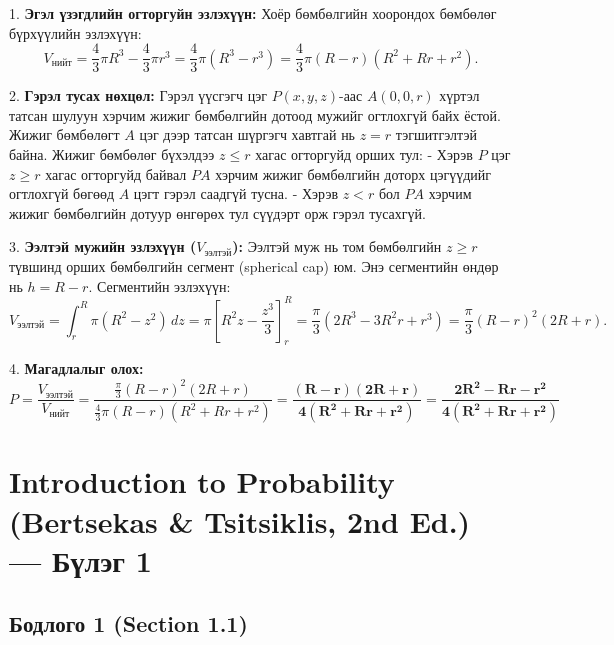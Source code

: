 \documentclass[11pt,a4paper]{article}
\begin{document}
1. 				\textbf{Эгэл үзэгдлийн огторгуйн эзлэхүүн:}
   Хоёр бөмбөлгийн хоорондох бөмбөлөг бүрхүүлийн эзлэхүүн:
   \[
     V_{\text{нийт}} = \frac{4}{3}\pi R^3 - \frac{4}{3}\pi r^3 = \frac{4}{3}\pi (R^3 - r^3) = \frac{4}{3}\pi (R - r)(R^2 + Rr + r^2).
   \]

2. 				\textbf{Гэрэл тусах нөхцөл:}
   Гэрэл үүсгэгч цэг $P(x, y, z)$-аас $A(0,0,r)$ хүртэл татсан шулуун хэрчим жижиг бөмбөлгийн дотоод мужийг огтлохгүй байх ёстой.
   Жижиг бөмбөлөгт $A$ цэг дээр татсан шүргэгч хавтгай нь $z = r$ тэгшитгэлтэй байна. Жижиг бөмбөлөг бүхэлдээ $z \le r$ хагас огторгуйд орших тул:
   - Хэрэв $P$ цэг $z \ge r$ хагас огторгуйд байвал $PA$ хэрчим жижиг бөмбөлгийн доторх цэгүүдийг огтлохгүй бөгөөд $A$ цэгт гэрэл саадгүй тусна.
   - Хэрэв $z < r$ бол $PA$ хэрчим жижиг бөмбөлгийн дотуур өнгөрөх тул сүүдэрт орж гэрэл тусахгүй.

3. 				\textbf{Ээлтэй мужийн эзлэхүүн ($V_{\text{ээлтэй}}$):}
   Ээлтэй муж нь том бөмбөлгийн $z \ge r$ түвшинд орших бөмбөлгийн сегмент (spherical cap) юм.
   Энэ сегментийн өндөр нь $h = R - r$.
   Сегментийн эзлэхүүн:
   \[
     V_{\text{ээлтэй}} = \int_r^R \pi (R^2 - z^2) \, dz = \pi \left[ R^2 z - \frac{z^3}{3} \right]_r^R = \frac{\pi}{3} (2R^3 - 3R^2 r + r^3) = \frac{\pi}{3}(R - r)^2(2R + r).
   \]

4. 				\textbf{Магадлалыг олох:}
   \[
     P = \frac{V_{\text{ээлтэй}}}{V_{\text{нийт}}} = \frac{\frac{\pi}{3}(R - r)^2(2R + r)}{\frac{4}{3}\pi (R - r)(R^2 + Rr + r^2)} = \mathbf{\frac{(R - r)(2R + r)}{4(R^2 + Rr + r^2)} = \frac{2R^2 - Rr - r^2}{4(R^2 + Rr + r^2)}}
   \]

\clearpage

\section[Bertsekas \& Tsitsiklis — Бүлэг 1]{Introduction to Probability (Bertsekas \& Tsitsiklis, 2nd Ed.) — Бүлэг 1}

\subsection*{Бодлого 1 (Section 1.1)}
\end{document}
